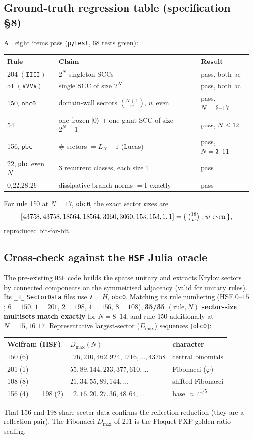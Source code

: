\documentclass[11pt]{article}
\newcommand{\rt}[1]{\texttt{#1}}
\begin{document}
\subsection{Ground-truth regression table (specification \S8)}
All eight items pass (\texttt{pytest}, 68 tests green):
\begin{center}
\begin{tabular}{@{}lll@{}}
\toprule
Rule & Claim & Result \\
\midrule
204 $(\rt I\rt I\rt I\rt I)$ & $2^N$ singleton SCCs & pass, both bc \\
51 $(\rt V\rt V\rt V\rt V)$ & single SCC of size $2^N$ & pass, both bc \\
150, \rt{obc0} & domain-wall sectors $\binom{N+1}{w}$, $w$ even & pass, $N=8\text{--}17$ \\
54 & one frozen $|0\rangle$ + one giant SCC of size $2^N-1$ & pass, $N\le12$ \\
156, \rt{pbc} & \# sectors $=L_N+1$ (Lucas) & pass, $N=3\text{--}11$ \\
22, \rt{pbc} even $N$ & 3 recurrent classes, each size 1 & pass \\
0,22,28,29 & dissipative branch norms $=1$ exactly & pass \\
\bottomrule
\end{tabular}
\end{center}
For rule 150 at $N=17$, \rt{obc0}, the exact sector sizes are
\[
[43758,43758,18564,18564,3060,3060,153,153,1,1]=\{\,\tbinom{18}{w}:w\text{ even}\,\},
\]
reproduced bit-for-bit.

\subsection{Cross-check against the \texttt{HSF} Julia oracle}
The pre-existing \rt{HSF} code builds the sparse unitary and extracts Krylov
sectors by connected components on the symmetrised adjacency (valid for unitary
rules). Its \rt{\_H\_} \rt{SectorData} files use $\rt V=H$, \rt{obc0}. Matching
its rule numbering (HSF $0\text{--}15$; $6{=}150$, $1{=}201$, $2{=}198$,
$4{=}156$, $8{=}108$), \textbf{35/35 $(\text{rule},N)$ sector-size multisets
match exactly} for $N=8\text{--}14$, and rule 150 additionally at $N=15,16,17$.
Representative largest-sector ($D_{\max}$) sequences (\rt{obc0}):
\begin{center}
\begin{tabular}{@{}lll@{}}
\toprule
Wolfram (HSF) & $D_{\max}(N)$ & character \\
\midrule
150 (6) & $126,210,462,924,1716,\dots,43758$ & central binomials \\
201 (1) & $55,89,144,233,377,610,\dots$ & Fibonacci ($\varphi$) \\
108 (8) & $21,34,55,89,144,\dots$ & shifted Fibonacci \\
156 (4) $=$ 198 (2) & $12,16,20,27,36,48,64,\dots$ & base $\approx4^{1/5}$ \\
\bottomrule
\end{tabular}
\end{center}
That 156 and 198 share sector data confirms the reflection reduction (they are a
reflection pair). The Fibonacci $D_{\max}$ of 201 is the Floquet-PXP golden-ratio
scaling.
\end{document}
